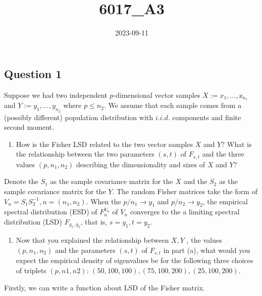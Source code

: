 \documentclass[
]{article}
\title{6017\_A3}
\author{}
\date{\vspace{-2.5em}2023-09-11}
\providecommand{\tightlist}{%
  \setlength{\itemsep}{0pt}\setlength{\parskip}{0pt}}
\begin{document}
\maketitle

\subsection{Question 1}\label{question-1}

Suppose we had two independent \(p\)-dimensional vector samples
\(X := {x_1,...,𝕩_{n_1}}\) and \(Y := {y_1,...,y_{n_2}}\) where
\(p \leq n_2\). We assume that each sample comes from a (possibly
different) population distribution with \(i.i.d.\) components and finite
second moment.

\begin{enumerate}
\def\labelenumi{(\alph{enumi})}
\tightlist
\item
  How is the Fisher LSD related to the two vector samples \(X\) and
  \(Y\)? What is the relationship between the two parameters \((s,t)\)
  of \(F_{s,t}\) and the three values \((p,n_1,n_2)\) describing the
  dimensionality and sizes of \(X\) and \(Y\)?
\end{enumerate}

Denote the \(S_1\) as the sample covariance matrix for the \(X\) and the
\(S_2\) as the sample covariance matrix for the \(Y\). The random Fisher
matrices take the form of \(V_n = S_1 S_2^{-1}, n = (n_1,n_2)\). When
the \(p/n_1 \rightarrow y_1\) and \(p/n_2 \rightarrow y_2\), the
empirical spectral distribution (ESD) of \(F_n^{V_n}\) of \(V_n\)
converges to the a limiting spectral distribution (LSD)
\(F_{y_1, y_2}\), that is, \(s = y_1, t = y_2\).

\begin{enumerate}
\def\labelenumi{(\alph{enumi})}
\setcounter{enumi}{1}
\tightlist
\item
  Now that you explained the relationship between \(X, Y\) , the values
  \((p, n_1, n_2)\) and the parameters \((s,t)\) of \(F_{s,t}\) in part
  (a), what would you expect the empirical density of eigenvalues be for
  the following three choices of triplets \((p, n1, n2)\):
  \((50, 100, 100), (75, 100, 200), (25, 100, 200)\).
\end{enumerate}

Firstly, we can write a function about LSD of the Fisher matrix.
\end{document}

